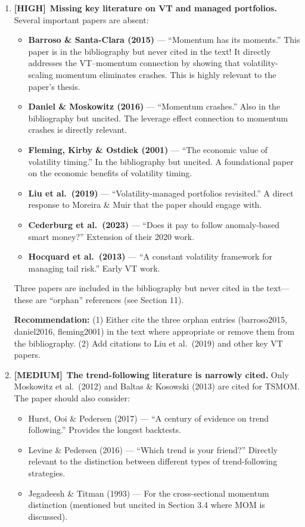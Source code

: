 \documentclass[12pt,a4paper]{article}
\newcommand{\HIGH}{\textcolor{highsev}{\textbf{[HIGH]}}}
\newcommand{\MEDIUM}{\textcolor{medsev}{\textbf{[MEDIUM]}}}
\begin{document}
\begin{enumerate}[label=\textbf{3.\arabic*}]

\item \HIGH\ \textbf{Missing key literature on VT and managed portfolios.}
Several important papers are absent:
\begin{itemize}
\item \textbf{Barroso \& Santa-Clara (2015)} --- ``Momentum has its moments.'' This paper is in the bibliography but never cited in the text! It directly addresses the VT--momentum connection by showing that volatility-scaling momentum eliminates crashes. This is highly relevant to the paper's thesis.
\item \textbf{Daniel \& Moskowitz (2016)} --- ``Momentum crashes.'' Also in the bibliography but uncited. The leverage effect connection to momentum crashes is directly relevant.
\item \textbf{Fleming, Kirby \& Ostdiek (2001)} --- ``The economic value of volatility timing.'' In the bibliography but uncited. A foundational paper on the economic benefits of volatility timing.
\item \textbf{Liu et al.\ (2019)} --- ``Volatility-managed portfolios revisited.'' A direct response to Moreira \& Muir that the paper should engage with.
\item \textbf{Cederburg et al.\ (2023)} --- ``Does it pay to follow anomaly-based smart money?'' Extension of their 2020 work.
\item \textbf{Hocquard et al.\ (2013)} --- ``A constant volatility framework for managing tail risk.'' Early VT work.
\end{itemize}
Three papers are included in the bibliography but never cited in the text---these are ``orphan'' references (see Section 11).

\textbf{Recommendation:} (1) Either cite the three orphan entries (barroso2015, daniel2016, fleming2001) in the text where appropriate or remove them from the bibliography. (2) Add citations to Liu et al.\ (2019) and other key VT papers.

\item \MEDIUM\ \textbf{The trend-following literature is narrowly cited.}
Only Moskowitz et al.\ (2012) and Baltas \& Kosowski (2013) are cited for TSMOM. The paper should also consider:
\begin{itemize}
\item Hurst, Ooi \& Pedersen (2017) --- ``A century of evidence on trend following.'' Provides the longest backtests.
\item Levine \& Pedersen (2016) --- ``Which trend is your friend?'' Directly relevant to the distinction between different types of trend-following strategies.
\item Jegadeesh \& Titman (1993) --- For the cross-sectional momentum distinction (mentioned but uncited in Section 3.4 where MOM is discussed).
\end{itemize}


\end{enumerate}
\end{document}
